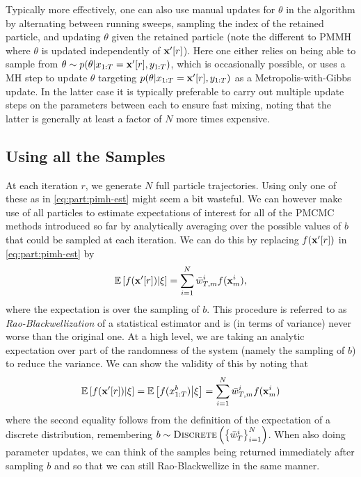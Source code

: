 Typically more effectively, one can also use manual updates for $\theta$ in the \pg algorithm by alternating
between running \csmc sweeps, sampling the index of the retained particle, and updating $\theta$ given
the retained particle (note the different to PMMH where $\theta$ is updated independently of $\mathbf{x}'[r]$).
Here one either relies on being able to sample from $\theta \sim p(\theta | x_{1:T}=\mathbf{x}'[r], y_{1:T})$, which is 
occasionally possible, or uses a MH step to update $\theta$ targeting $p(\theta | x_{1:T}=\mathbf{x}'[r], y_{1:T})$ as
a Metropolis-with-Gibbs update.  In the latter case it is typically preferable to carry out multiple update steps
on the parameters between each \csmc to ensure fast mixing, noting that the latter is generally at least a 
factor of $N$ more times expensive.

\subsection{Using all the Samples}
\label{sec:part:pmcmc:all}

At each \mcmc iteration $r$, we generate $N$ full particle trajectories. 
Using only one of these as in \eqref{eq:part:pimh-est} might seem a bit wasteful. 
We can however make use of all particles to estimate expectations of interest for all
of the PMCMC methods introduced so far by analytically averaging over the possible
values of $b$ that could be sampled at each iteration. 
We can do this by replacing $f(\mathbf{x}'[r])$ in \eqref{eq:part:pimh-est}  by
\begin{align}
\label{eq:part:rao-pg}
\mathbb{E}\left[f(\mathbf{x}'[r]) \middle| \mathbf{\xi} \right] 
= \sum_{i=1}^N \bar w_{T,m}^i f(\mathbf{x}_{m}^i),
\end{align}
where the expectation is over the sampling of $b$.
This procedure is referred to as \emph{Rao-Blackwellization} of a statistical estimator and is (in terms of variance) 
never worse than the original one.  At a high level, we are taking an analytic expectation over part of
the randomness of the system (namely the sampling of $b$) to reduce the variance.  We can 
show the validity of this by noting that
\begin{align}
\mathbb{E}\left[f(\mathbf{x}'[r]) \middle| \mathbf{\xi} \right] = 
\mathbb{E}\left[f(x_{1:T}^b) \middle| \mathbf{\xi} \right]
= \sum_{i=1}^N \bar w_{T,m}^i f(\mathbf{x}_{m}^i)
\end{align}
where the second equality follows from the definition of the expectation of a discrete distribution,
remembering $b \sim \operatorname*{\textsc{Discrete}}\left(\left\{\bar w_{T}^i\right\}_{i=1}^N\right)$.
When also doing parameter updates, we can think of the samples being returned immediately after
sampling $b$ and so that we can still Rao-Blackwellize in the same manner.

